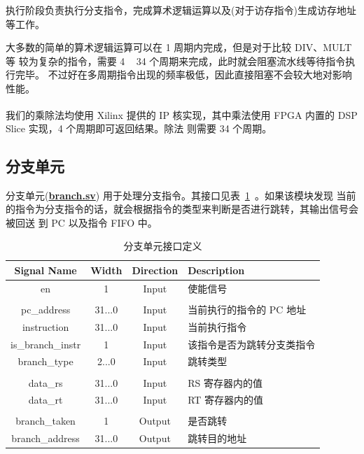 \documentclass[blue,normal,cn,hide]{elegantbook}
\begin{document}
执行阶段负责执行分支指令，完成算术逻辑运算以及(对于访存指令)生成访存地址
等工作。

大多数的简单的算术逻辑运算可以在 1 周期内完成，但是对于比较 DIV、MULT 等
较为复杂的指令，需要 4 ~ 34 个周期来完成，此时就会阻塞流水线等待指令执行完毕。
不过好在多周期指令出现的频率极低，因此直接阻塞不会较大地对影响性能。

我们的乘除法均使用 Xilinx\textsuperscript{\textregistered} 提供的 IP
核实现，其中乘法使用 FPGA 内置的 DSP Slice 实现，4 个周期即可返回结果。除法
则需要 34 个周期。

\subsection{分支单元}

分支单元(\href{https://github.com/name1e5s/Sirius/blob/master/branch.sv}{\textbf{branch.sv}})
用于处理分支指令。其接口见表~\ref{tab:BranchUnitInterface}~。如果该模块发现
当前的指令为分支指令的话，就会根据指令的类型来判断是否进行跳转，其输出信号会被回送
到 PC 以及指令 FIFO 中。

\begin{table}
    \renewcommand\arraystretch{1.25}
    \centering
    \begin{tabular}{cccm{}}
        \toprule 
        \rowcolor{black!20} \textbf{Signal Name} & \textbf{Width} & \textbf{Direction} & \textbf{Description} \\
        \midrule
        en & 1 & Input & 使能信号 \\
        \\
        pc\_address & 31...0 & Input & 当前执行的指令的 PC 地址 \\
        instruction & 31...0 & Input & 当前执行指令 \\
        is\_branch\_instr & 1 & Input & 该指令是否为跳转分支类指令 \\
        branch\_type & 2...0 & Input & 跳转类型 \\
        \\
        data\_rs & 31...0 & Input & RS 寄存器内的值 \\
        data\_rt & 31...0 & Input & RT 寄存器内的值 \\
        \\
        branch\_taken & 1 & Output & 是否跳转 \\
        branch\_address & 31...0 & Output & 跳转目的地址 \\
        \bottomrule
    \end{tabular}
    \caption{分支单元接口定义}
    \label{tab:BranchUnitInterface}
\end{table}
\end{document}
